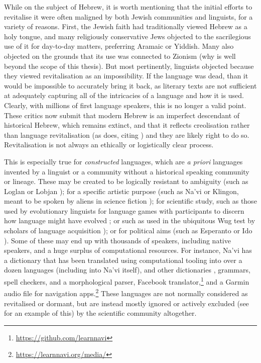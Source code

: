 While on the subject of Hebrew, it is worth mentioning that the initial efforts to revitalise it were often maligned by both Jewish communities and linguists, for a variety of reasons. First, the Jewish faith had traditionally viewed Hebrew as a holy tongue, and many religiously conservative Jews objected to the sacrilegious use of it for day-to-day matters, preferring Aramaic or Yiddish. Many also objected on the grounds that its use was connected to Zionism (why is well beyond the scope of this thesis). But most pertinently, linguists objected because they viewed revitalisation as an impossibility. If the language was dead, than it would be impossible to accurately bring it back, as literary texts are not sufficient at adequately capturing all of the intricacies of a language and how it is used. Clearly, with millions of first language speakers, this is no longer a valid point. These critics now submit that modern Hebrew is an imperfect descendant of historical Hebrew, which remains extinct, and that it reflects creolisation rather than language revitalisation (as \citet{kornai2013digital} does, citing \citet{bickerton2016roots,izreel2003emergence}) and they are likely right to do so. Revitalisation is not always an ethically or logistically clear process.

This is especially true for \textit{constructed} languages, which are \textit{a priori} languages invented by a linguist or a community without a historical speaking community or lineage. These may be created to be logically resistant to ambiguity (such as Loglan or Lobjan \citep{okrent2009land}); for a specific artistic purpose (such as Na'vi or Klingon, meant to be spoken by aliens in science fiction \citep{schreyer2015digital, schreyer2011media}); for scientific study, such as those used by evolutionary linguists for language games with participants to discern how language might have evolved \citep{scott2010language}; or such as used in the ubiquitous Wug test by scholars of language acquisition \citep{ratner2000beginning}); or for political aims (such as Esperanto or Ido \citep{okrent2009land}). Some of these may end up with thousands of speakers, including native speakers, and a huge surplus of computational resources. For instance, Na'vi has a dictionary \citep{navidictionary} that has been translated using computational tooling into over a dozen languages (including into Na'vi itself), and other dictionaries \citep{wmannis}, grammars, spell checkers, and a morphological parser, Facebook translator,\footnote{\href{https://github.com/learnnavi}{https://github.com/learnnavi}} and a Garmin audio file for navigation apps.\footnote{\href{https://learnnavi.org/media/}{https://learnnavi.org/media/}} These languages are not normally considered as revitalised or dormant, but are instead mostly ignored or actively excluded (see \citet{gibson2016assessing} for an example of this) by the scientific community altogether.

